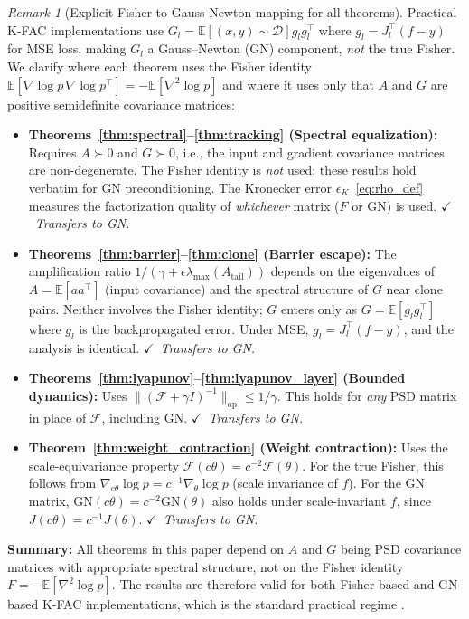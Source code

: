 \documentclass{article}
\providecommand{\E}{\mathbb{E}}
\providecommand{\FIM}{\mathcal{F}}
\providecommand{\norm}[1]{\lVert #1 \rVert}
\theoremstyle{plain}
\theoremstyle{definition}
\theoremstyle{remark}
\newtheorem{remark}{Remark}
\begin{document}
\begin{remark}[Explicit Fisher-to-Gauss-Newton mapping for all theorems]
\label{rem:fisher_gn}
Practical K-FAC implementations use $G_l = \E[(x,y)\sim\mathcal{D}]{g_l g_l^\top}$ where $g_l = J_l^\top(f-y)$ for MSE loss, making $G_l$ a Gauss--Newton (GN) component, \emph{not} the true Fisher. We clarify where each theorem uses the Fisher identity $\E[\nabla\log p\,\nabla\log p^\top] = -\E[\nabla^2\log p]$ and where it uses only that $A$ and $G$ are positive semidefinite covariance matrices:
\begin{itemize}
    \item \textbf{Theorems~\ref{thm:spectral}--\ref{thm:tracking} (Spectral equalization):} Requires $A \succ 0$ and $G \succ 0$, i.e., the input and gradient covariance matrices are non-degenerate. The Fisher identity is \emph{not} used; these results hold verbatim for GN preconditioning. The Kronecker error $\epsilon_K$~\eqref{eq:rho_def} measures the factorization quality of \emph{whichever} matrix ($F$ or GN) is used. $\checkmark$~\emph{Transfers to GN.}
    \item \textbf{Theorems~\ref{thm:barrier}--\ref{thm:clone} (Barrier escape):} The amplification ratio $1/(\gamma + \epsilon\lambda_{\max}(A_{\mathrm{tail}}))$ depends on the eigenvalues of $A = \E[aa^\top]$ (input covariance) and the spectral structure of $G$ near clone pairs. Neither involves the Fisher identity; $G$ enters only as $G = \E[g_l g_l^\top]$ where $g_l$ is the backpropagated error. Under MSE, $g_l = J_l^\top(f-y)$, and the analysis is identical. $\checkmark$~\emph{Transfers to GN.}
    \item \textbf{Theorems~\ref{thm:lyapunov}--\ref{thm:lyapunov_layer} (Bounded dynamics):} Uses $\norm{(\FIM + \gamma I)^{-1}}_{\mathrm{op}} \leq 1/\gamma$. This holds for \emph{any} PSD matrix in place of $\FIM$, including GN. $\checkmark$~\emph{Transfers to GN.}
    \item \textbf{Theorem~\ref{thm:weight_contraction} (Weight contraction):} Uses the scale-equivariance property $\FIM(c\theta) = c^{-2}\FIM(\theta)$. For the true Fisher, this follows from $\nabla_{c\theta}\log p = c^{-1}\nabla_\theta\log p$ (scale invariance of $f$). For the GN matrix, $\mathrm{GN}(c\theta) = c^{-2}\mathrm{GN}(\theta)$ also holds under scale-invariant $f$, since $J(c\theta) = c^{-1}J(\theta)$. $\checkmark$~\emph{Transfers to GN.}
\end{itemize}
\textbf{Summary:} All theorems in this paper depend on $A$ and $G$ being PSD covariance matrices with appropriate spectral structure, not on the Fisher identity $F = -\E[\nabla^2\log p]$. The results are therefore valid for both Fisher-based and GN-based K-FAC implementations, which is the standard practical regime \citep{martens2020ngd}.
\end{remark}
\end{document}
